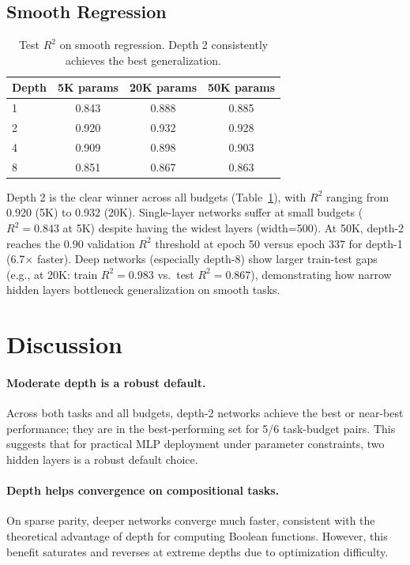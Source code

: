 \documentclass[11pt,a4paper]{article}
\begin{document}
\subsection{Smooth Regression}

\begin{table}[h]
\centering
\caption{Test $R^2$ on smooth regression. Depth 2 consistently achieves the best generalization.}
\label{tab:reg-r2}
\begin{tabular}{@{}lccc@{}}
\toprule
Depth & 5K params & 20K params & 50K params \\
\midrule
1 & 0.843 & 0.888 & 0.885 \\
2 & 0.920 & 0.932 & 0.928 \\
4 & 0.909 & 0.898 & 0.903 \\
8 & 0.851 & 0.867 & 0.863 \\
\bottomrule
\end{tabular}
\end{table}

Depth 2 is the clear winner across all budgets (Table~\ref{tab:reg-r2}), with $R^2$ ranging from 0.920 (5K) to 0.932 (20K). Single-layer networks suffer at small budgets ($R^2 = 0.843$ at 5K) despite having the widest layers (width=500). At 50K, depth-2 reaches the 0.90 validation $R^2$ threshold at epoch 50 versus epoch 337 for depth-1 (6.7$\times$ faster). Deep networks (especially depth-8) show larger train-test gaps (e.g., at 20K: train $R^2=0.983$ vs.\ test $R^2=0.867$), demonstrating how narrow hidden layers bottleneck generalization on smooth tasks.

\section{Discussion}

\paragraph{Moderate depth is a robust default.} Across both tasks and all budgets, depth-2 networks achieve the best or near-best performance; they are in the best-performing set for 5/6 task-budget pairs. This suggests that for practical MLP deployment under parameter constraints, two hidden layers is a robust default choice.

\paragraph{Depth helps convergence on compositional tasks.} On sparse parity, deeper networks converge much faster, consistent with the theoretical advantage of depth for computing Boolean functions. However, this benefit saturates and reverses at extreme depths due to optimization difficulty.
\end{document}
